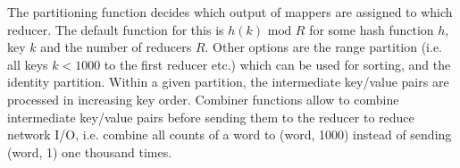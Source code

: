 The partitioning function decides which output of mappers are assigned to which reducer. The default function for this is $h(k) \text{ mod } R$ for some hash function $h$, key $k$ and the number of reducers $R$. Other options are the range partition (i.e. all keys $k < 1000$ to the first reducer etc.) which can be used for sorting, and the identity partition. Within a given partition, the intermediate key/value pairs are processed in increasing key order. Combiner functions allow to combine intermediate key/value pairs before sending them to the reducer to reduce network I/O, i.e. combine all counts of a word to (word, 1000) instead of sending (word, 1) one thousand times.